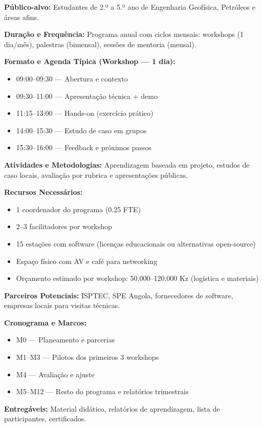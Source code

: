 \documentclass[12pt,a4paper]{article}
\begin{document}
\textbf{Público-alvo:} Estudantes de 2.º a 5.º ano de Engenharia Geofísica, Petróleos e áreas afins.

\textbf{Duração e Frequência:} Programa anual com ciclos mensais: workshops (1 dia/mês), palestras (bimensal), sessões de mentoria (mensal).

\textbf{Formato e Agenda Típica (Workshop — 1 dia):}
\begin{itemize}
    \item 09:00–09:30 — Abertura e contexto
    \item 09:30–11:00 — Apresentação técnica + demo
    \item 11:15–13:00 — Hands-on (exercício prático)
    \item 14:00–15:30 — Estudo de caso em grupos
    \item 15:30–16:00 — Feedback e próximos passos
\end{itemize}

\textbf{Atividades e Metodologias:} Aprendizagem baseada em projeto, estudos de caso locais, avaliação por rubrica e apresentações públicas.

\textbf{Recursos Necessários:}
\begin{itemize}
    \item 1 coordenador do programa (0.25 FTE)
    \item 2–3 facilitadores por workshop
    \item 15 estações com software (licenças educacionais ou alternativas open-source)
    \item Espaço físico com AV e café para networking
    \item Orçamento estimado por workshop: 50.000–120.000 Kz (logística e materiais)
\end{itemize}

\textbf{Parceiros Potenciais:} ISPTEC, SPE Angola, fornecedores de software, empresas locais para visitas técnicas.

\textbf{Cronograma e Marcos:}
\begin{itemize}
    \item M0 — Planeamento e parcerias
    \item M1–M3 — Pilotos dos primeiros 3 workshops
    \item M4 — Avaliação e ajuste
    \item M5–M12 — Resto do programa e relatórios trimestrais
\end{itemize}

\textbf{Entregáveis:} Material didático, relatórios de aprendizagem, lista de participantes, certificados.
\end{document}
